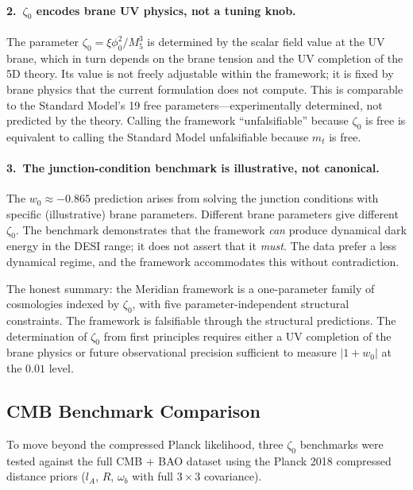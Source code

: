 \paragraph{2.\ $\zeta_0$ encodes brane UV physics, not a tuning knob.} The parameter $\zeta_0 = \xi\phi_0^2/M_5^3$ is determined by the scalar field value at the UV brane, which in turn depends on the brane tension and the UV completion of the 5D theory. Its value is not freely adjustable within the framework; it is fixed by brane physics that the current formulation does not compute. This is comparable to the Standard Model's 19 free parameters---experimentally determined, not predicted by the theory. Calling the framework ``unfalsifiable'' because $\zeta_0$ is free is equivalent to calling the Standard Model unfalsifiable because $m_t$ is free.

\paragraph{3.\ The junction-condition benchmark is illustrative, not canonical.} The $w_0 \approx -0.865$ prediction arises from solving the junction conditions with specific (illustrative) brane parameters. Different brane parameters give different $\zeta_0$. The benchmark demonstrates that the framework \emph{can} produce dynamical dark energy in the DESI range; it does not assert that it \emph{must}. The data prefer a less dynamical regime, and the framework accommodates this without contradiction.

The honest summary: the Meridian framework is a one-parameter family of cosmologies indexed by $\zeta_0$, with five parameter-independent structural constraints. The framework is falsifiable through the structural predictions. The determination of $\zeta_0$ from first principles requires either a UV completion of the brane physics or future observational precision sufficient to measure $|1+w_0|$ at the $0.01$ level.

\subsection{CMB Benchmark Comparison}
\label{sec:2-CMB-benchmarks}

To move beyond the compressed Planck likelihood, three $\zeta_0$ benchmarks were tested against the full CMB + BAO dataset using the Planck 2018 compressed distance priors ($l_A$, $R$, $\omega_b$ with full $3 \times 3$ covariance).

